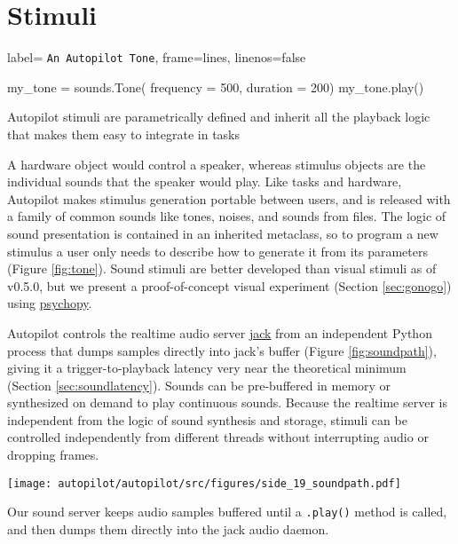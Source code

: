\section{Stimuli}
\label{sec:stim}

\begin{marginfigure}[0.45cm]
\begin{pythoncode*}{
label= \texttt{An Autopilot Tone},
frame=lines,
linenos=false}

my_tone = sounds.Tone(
    frequency = 500,
    duration  = 200)
my_tone.play()
\end{pythoncode*}
\caption{Autopilot stimuli are parametrically defined and inherit all the playback logic that makes them easy to integrate in tasks}
\label{fig:tone}
\end{marginfigure}

A hardware object would control a speaker, whereas stimulus objects are the individual sounds that the speaker would play. Like tasks and hardware, Autopilot makes stimulus generation portable between users, and is released with a family of common sounds like tones, noises, and sounds from files. The logic of sound presentation is contained in an inherited metaclass, so to program a new stimulus a user only needs to describe how to generate it from its parameters (Figure \ref{fig:tone}).  Sound stimuli are better developed than visual stimuli as of v0.5.0, but we present a proof-of-concept visual experiment (Section \ref{sec:gonogo}) using \href{https://www.psychopy.org/}{psychopy}\citep{peircePsychoPy2ExperimentsBehavior2019}.

Autopilot controls the realtime audio server \href{http://jackaudio.org/}{jack} from an independent Python process that dumps samples directly into jack's buffer (Figure \ref{fig:soundpath}), giving it a trigger-to-playback latency very near the theoretical minimum (Section \ref{sec:soundlatency}). Sounds can be pre-buffered in memory or synthesized on demand to play continuous sounds. Because the realtime server is independent from the logic of sound synthesis and storage, stimuli can be controlled independently from different threads without interrupting audio or dropping frames.

\begin{marginfigure}[0cm]
\texttt{[image: autopilot/autopilot/src/figures/side\_19\_soundpath.pdf]}
\caption{Our sound server keeps audio samples buffered until a \texttt{.play()} method is called, and then dumps them directly into the jack audio daemon.}
\label{fig:soundpath}
\end{marginfigure}

